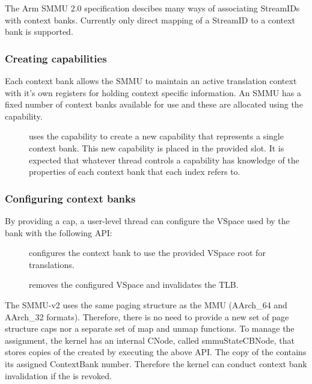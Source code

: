 The Arm SMMU 2.0 specification descibes many ways of associating StreamIDs with
context banks. Currently only direct mapping of a StreamID to a context bank is
supported.

\subsubsection{Creating  capabilities}
\label{sec:smmuv2-creating-sel4-arm-cb-capabilities}

Each context bank allows the SMMU to maintain an active translation context with
it's own registers for holding context specific information. An SMMU has a fixed
number of context banks available for use and these are allocated using the
 capability.

\begin{description}

\item[] uses the
     capability to create a new 
    capability that represents a single context bank.  This new capability is
    placed in the provided slot.  It is expected that whatever thread controls a
     capability has knowledge of the properties of each
    context bank that each index refers to.
\end{description}


\subsubsection{Configuring context banks}
\label{sec:smmuv2-configuring-context-banks}

By providing a  cap, a user-level thread can configure the
VSpace used by the bank with the following API:

\begin{description}
    \item[] configures
        the context bank to use the provided VSpace root for translations.
    \item[] removes
        the configured VSpace and invalidates the TLB.
\end{description}

The SMMU-v2 uses the same paging structure as the MMU (AArch\_64 and AArch\_32
formats). Therefore, there is no need to provide a new set of page structure caps
nor a separate set of map and unmap functions. To manage the assignment, the
kernel has an internal CNode, called smmuStateCBNode, that stores copies of the
 created by executing the above API. The copy of the
 contains its assigned ContextBank number. Therefore the kernel
can conduct context bank invalidation if the  is revoked.


